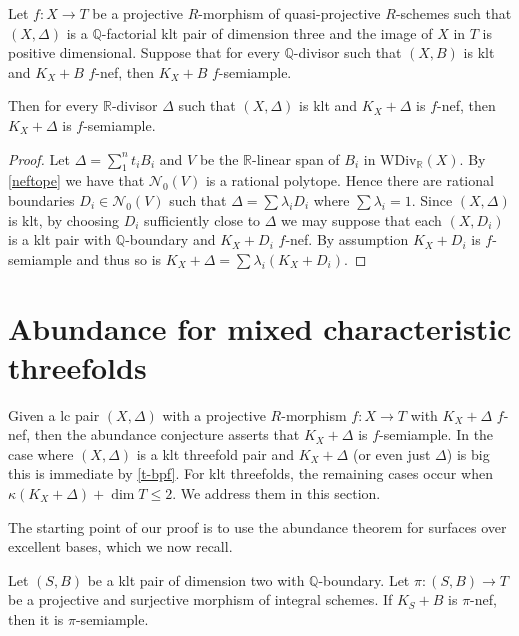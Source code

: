 	\begin{proposition}\label{QtoR}
		Let $f \colon X \to T$ be a projective $R$-morphism of quasi-projective $R$-schemes such that $(X,\Delta)$ is a $\mathbb{Q}$-factorial klt pair of dimension three and the image of $X$ in $T$ is positive dimensional. 
		Suppose that for every $\mathbb{Q}$-divisor such that $(X,B)$ is klt and $K_{X}+B$ $f$-nef, then $K_{X}+B$ $f$-semiample.
		
		Then for every $\mathbb{R}$-divisor $\Delta$ such that $(X, \Delta)$ is klt and $K_X+\Delta$ is $f$-nef, then $K_X+\Delta$ is $f$-semiample.
	\end{proposition}
	\begin{proof}
		Let $\Delta= \sum_{1}^{n} t_{i}B_{i}$ and $V$ be the $\mathbb{R}$-linear span of $B_i$ in $\text{WDiv}_\mathbb{R}(X)$. By \autoref{neftope} we have that $\mathcal{N}_{0}(V)$ is a rational polytope. Hence there are rational boundaries $D_{i} \in \mathcal{N}_{0}(V)$ such that $\Delta=\sum \lambda_{i} D_{i}$ where $\sum \lambda_{i} =1$. Since $(X,\Delta)$ is klt, by choosing $D_{i}$ sufficiently close to $\Delta$ we may suppose that each $(X,D_{i})$ is a klt pair with $\mathbb{Q}$-boundary and $K_X+D_i$ $f$-nef. 
		By assumption $K_{X}+D_{i}$ is $f$-semiample and thus so is $K_{X}+\Delta=\sum \lambda_{i} (K_{X}+D_{i})$.
	\end{proof}
	
	\section{Abundance for mixed characteristic threefolds}
	
	Given a lc pair $(X,\Delta)$ with a projective $R$-morphism $f \colon X \to T$ with $K_{X}+\Delta$ $f$-nef, then the abundance conjecture asserts that $K_{X}+\Delta$ is $f$-semiample. 
	In the case where $(X,\Delta)$ is a klt threefold pair and $K_{X}+\Delta$ (or even just $\Delta$) is big this is immediate by \autoref{t-bpf}. For klt threefolds, the remaining cases occur when $\kappa(K_{X}+\Delta) + \dim T \leq 2$. We address them in this section.
	
	The starting point of our proof is to use the abundance theorem for surfaces over excellent bases, which we now recall. 
	
	\begin{theorem}\label{abundance-dim2}
		Let $(S,B)$ be a klt pair of dimension two with $\mathbb{Q}$-boundary. 
		Let $\pi \colon (S,B) \to T$ be a projective and surjective morphism of integral schemes. If $K_{S}+B$ is $\pi$-nef, then it is $\pi$-semiample.
	\end{theorem}
	
